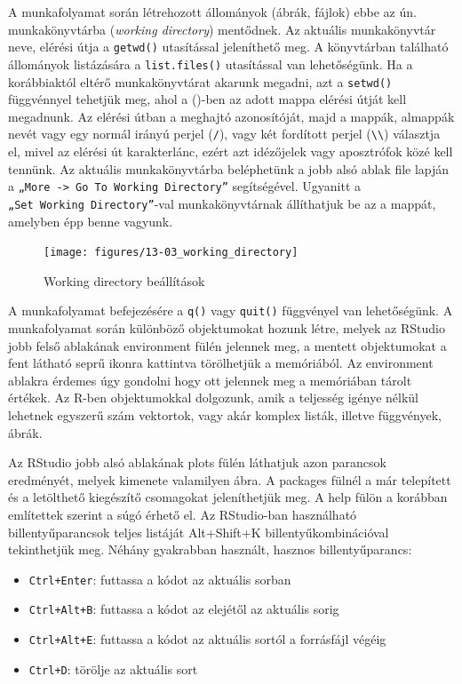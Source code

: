 \documentclass[
]{book}
\providecommand{\tightlist}{%
  \setlength{\itemsep}{0pt}\setlength{\parskip}{0pt}}
\begin{document}
A munkafolyamat során létrehozott állományok (ábrák, fájlok) ebbe az ún.
munkakönyvtárba (\emph{working directory}) mentődnek. Az aktuális
munkakönyvtár neve, elérési útja a \texttt{getwd()} utasítással
jeleníthető meg. A könyvtárban található állományok listázására a
\texttt{list.files()} utasítással van lehetőségünk. Ha a korábbiaktól
eltérő munkakönyvtárat akarunk megadni, azt a \texttt{setwd()}
függvénnyel tehetjük meg, ahol a ()-ben az adott mappa elérési útját
kell megadnunk. Az elérési útban a meghajtó azonosítóját, majd a mappák,
almappák nevét vagy egy normál irányú perjel (\texttt{/}), vagy két
fordított perjel (\texttt{\textbackslash{}\textbackslash{}}) választja
el, mivel az elérési út karakterlánc, ezért azt idézőjelek vagy
aposztrófok közé kell tennünk. Az aktuális munkakönyvtárba beléphetünk a
jobb alsó ablak file lapján a
\texttt{„More\ -\textgreater{}\ Go\ To\ Working\ Directory”}
segítségével. Ugyanitt a \texttt{„Set\ Working\ Directory”}-val
munkakönyvtárnak állíthatjuk be az a mappát, amelyben épp benne vagyunk.

\begin{figure}

{\centering \texttt{[image: figures/13-03\_working\_directory]} 

}

\caption{Working directory beállítások}\label{fig:unnamed-chunk-107}
\end{figure}

A munkafolyamat befejezésére a \texttt{q()} vagy \texttt{quit()}
függvényel van lehetőségünk. A munkafolyamat során különböző
objektumokat hozunk létre, melyek az RStudio jobb felső ablakának
environment fülén jelennek meg, a mentett objektumokat a fent látható
seprű ikonra kattintva törölhetjük a memóriából. Az environment ablakra
érdemes úgy gondolni hogy ott jelennek meg a memóriában tárolt értékek.
Az R-ben objektumokkal dolgozunk, amik a teljesség igénye nélkül
lehetnek egyszerű szám vektortok, vagy akár komplex listák, illetve
függvények, ábrák.

Az RStudio jobb alsó ablakának plots fülén láthatjuk azon parancsok
eredményét, melyek kimenete valamilyen ábra. A packages fülnél a már
telepített és a letölthető kiegészítő csomagokat jeleníthetjük meg. A
help fülön a korábban említettek szerint a súgó érhető el. Az
RStudio-ban használható billentyűparancsok teljes listáját Alt+Shift+K
billentyűkombinációval tekinthetjük meg. Néhány gyakrabban használt,
hasznos billentyűparancs:

\begin{itemize}
\tightlist
\item
  \texttt{Ctrl+Enter}: futtassa a kódot az aktuális sorban
\item
  \texttt{Ctrl+Alt+B}: futtassa a kódot az elejétől az aktuális sorig
\item
  \texttt{Ctrl+Alt+E}: futtassa a kódot az aktuális sortól a forrásfájl
  végéig
\item
  \texttt{Ctrl+D}: törölje az aktuális sort
\end{itemize}
\end{document}
